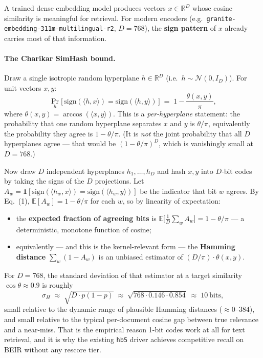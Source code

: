 \documentclass[11pt,a4paper]{article}
\begin{document}
A trained dense embedding model produces vectors $x \in \mathbb{R}^D$
whose cosine similarity is meaningful for retrieval. For modern
encoders (e.g.\ \texttt{granite-embedding-311m-multilingual-r2},
$D = 768$), the \textbf{sign pattern} of $x$ already carries most of
that information.

\paragraph{The Charikar SimHash bound.} Draw a single isotropic random
hyperplane $h \in \mathbb{R}^D$ (i.e.\ $h \sim \mathcal{N}(0, I_D)$).
For unit vectors $x, y$:
\begin{equation}
\Pr_{h}\bigl[\,\mathrm{sign}(\langle h, x\rangle) = \mathrm{sign}(\langle h, y\rangle)\,\bigr]
\;=\; 1 - \frac{\theta(x,y)}{\pi},
\end{equation}
where $\theta(x, y) = \arccos(\langle x, y\rangle)$. This is a
\emph{per-hyperplane} statement: the probability that one random
hyperplane separates $x$ and $y$ is $\theta/\pi$, equivalently the
probability they agree is $1 - \theta/\pi$. (It is \emph{not} the
joint probability that all $D$ hyperplanes agree --- that would be
$(1 - \theta/\pi)^D$, which is vanishingly small at $D = 768$.)

Now draw $D$ independent hyperplanes $h_1, \dots, h_D$ and hash $x,
y$ into $D$-bit codes by taking the signs of the $D$ projections.
Let $A_w = \mathbf{1}[\mathrm{sign}(\langle h_w, x\rangle) =
\mathrm{sign}(\langle h_w, y\rangle)]$ be the indicator that bit $w$
agrees. By Eq.~(1), $\mathbb{E}[A_w] = 1 - \theta/\pi$ for each $w$,
so by linearity of expectation:
\begin{itemize}
  \item the \textbf{expected fraction of agreeing bits} is
  $\mathbb{E}\bigl[\tfrac{1}{D}\sum_w A_w\bigr] = 1 - \theta/\pi$
  --- a deterministic, monotone function of cosine;
  \item equivalently --- and this is the kernel-relevant form --- the
  \textbf{Hamming distance} $\sum_w (1 - A_w)$ is an unbiased
  estimator of $(D/\pi)\cdot\theta(x,y)$.
\end{itemize}

For $D = 768$, the standard deviation of that estimator at a target
similarity $\cos\theta \approx 0.9$ is roughly
\begin{equation}
\sigma_H \;\approx\; \sqrt{D \cdot p(1-p)} \;\approx\; \sqrt{768 \cdot 0.146 \cdot 0.854} \;\approx\; 10\ \text{bits},
\end{equation}
small relative to the dynamic range of plausible Hamming distances
($\approx 0$--$384$), and small relative to the typical per-document
cosine gap between true relevance and a near-miss. That is the
empirical reason 1-bit codes work at all for text retrieval, and it is
why the existing \texttt{hb5} driver achieves competitive recall on
BEIR without any rescore tier.
\end{document}
